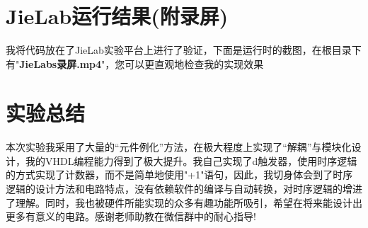 \documentclass[UTF8, onecolumn, a4paper]{article}
\begin{document}
\section{JieLab运行结果(附录屏)}
我将代码放在了JieLab实验平台上进行了验证，下面是运行时的截图，在根目录下有"\textbf{JieLabs录屏.mp4}"，您可以更直观地检查我的实现效果
\begin{figure}[htb]
	\centering
\end{figure}
\section{实验总结}
\paragraph*{}
本次实验我采用了大量的“元件例化”方法，在极大程度上实现了“解耦”与模块化设计，我的VHDL编程能力得到了极大提升。我自己实现了d触发器，使用时序逻辑的方式实现了计数器，而不是简单地使用"+1"语句，因此，我切身体会到了时序逻辑的设计方法和电路特点，没有依赖软件的编译与自动转换，对时序逻辑的增进了理解。同时，我也被硬件所能实现的众多有趣功能所吸引，希望在将来能设计出更多有意义的电路。感谢老师助教在微信群中的耐心指导!
\end{document}
